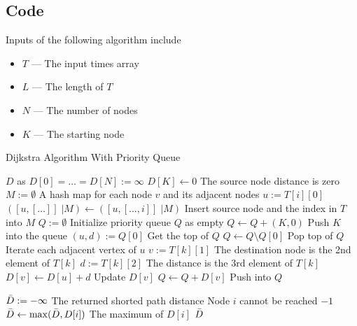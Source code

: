 \documentclass[a4paper,12pt]{article}
\begin{document}
\subsection{Code}
Inputs of the following algorithm include
\begin{itemize}
\item $T$ --- The input times array
\item $L$ --- The length of $T$
\item $N$ --- The number of nodes
\item $K$ --- The starting node
\end{itemize}
\begin{algorithm}[H]
\caption{Dijkstra Algorithm With Priority Queue}
\begin{algorithmic}[1]
\State $D$ as $D[0]=\ldots=D[N]:=\infty$
\State $D[K]\gets 0$ \Comment The source node distance is zero
\State $M:=\emptyset$ \Comment A hash map for each node $v$ and its adjacent nodes
\State $u:= T[i][0]$
\State $([u, [\ldots]]\;|M) \gets ([u, [\ldots, i]]\;|M)$ \Comment Insert source node and the index in $T$ into $M$
\EndFor
\State $Q:=\emptyset$ \Comment Initialize priority queue $Q$ as empty
\State $Q\gets Q + (K, 0)$ \Comment Push $K$ into the queue
\State $(u, d):= Q[0]$ \Comment Get the top of $Q$
\State $Q\gets Q \setminus Q[0]$ \Comment Pop top of $Q$
 \Comment Iterate each adjacent vertex of $u$
\State $v:= T[k][1]$ \Comment The destination node is the 2nd element of $T[k]$
\State $d:=T[k][2]$ \Comment The distance is the 3rd element of $T[k]$
\State $D[v]\gets D[u] + d$ \Comment Update $D[v]$
\State $Q\gets Q + D[v]$ \Comment Push into $Q$
\EndIf
\EndFor
\EndWhile
{}
\end{algorithmic}
\end{algorithm}

\begin{algorithm}[H]
\begin{algorithmic}[1]
\State $\Bar{D}:= -\infty$ \Comment The returned shorted path distance
 \Comment Node $i$ cannot be reached
\State \Return $-1$
\EndIf
\State $\Bar{D} \gets \max(\Bar{D}, D[i]) $ \Comment The maximum of $D[i]$
\EndFor
\State \Return $\Bar{D}$
\EndProcedure
\end{algorithmic}
\end{algorithm}
\end{document}
